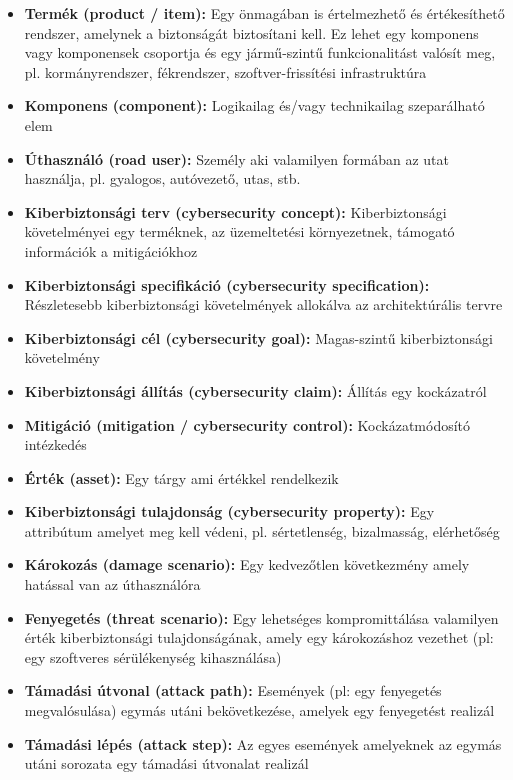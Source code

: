 \begin{itemize}
    \item \textbf{Termék (product / item):} Egy önmagában is értelmezhető és értékesíthető rendszer, amelynek a biztonságát biztosítani kell. Ez lehet egy komponens vagy komponensek csoportja és egy jármű-szintű funkcionalitást valósít meg, pl. kormányrendszer, fékrendszer, szoftver-frissítési infrastruktúra
    \item \textbf{Komponens (component):} Logikailag és/vagy technikailag szeparálható elem    
    \item \textbf{Úthasználó (road user):} Személy aki valamilyen formában az utat használja, pl. gyalogos, autóvezető, utas, stb.
    \item \textbf{Kiberbiztonsági terv (cybersecurity concept):} Kiberbiztonsági követelményei egy terméknek, az üzemeltetési környezetnek, támogató információk a mitigációkhoz
    \item \textbf{Kiberbiztonsági specifikáció (cybersecurity specification):} Részletesebb kiberbiztonsági követelmények allokálva az architektúrális tervre
    \item \textbf{Kiberbiztonsági cél (cybersecurity goal):} Magas-szintű kiberbiztonsági követelmény
    \item \textbf{Kiberbiztonsági állítás (cybersecurity claim):} Állítás egy kockázatról
    \item \textbf{Mitigáció (mitigation / cybersecurity control):} Kockázatmódosító intézkedés
    \item \textbf{Érték (asset):} Egy tárgy ami értékkel rendelkezik
    \item \textbf{Kiberbiztonsági tulajdonság (cybersecurity property):} Egy attribútum amelyet meg kell védeni, pl. sértetlenség, bizalmasság, elérhetőség
    \item \textbf{Károkozás (damage scenario):} Egy kedvezőtlen következmény amely hatással van az úthasználóra
    \item \textbf{Fenyegetés (threat scenario):} Egy lehetséges kompromittálása valamilyen érték kiberbiztonsági tulajdonságának, amely egy károkozáshoz vezethet (pl: egy szoftveres sérülékenység kihasználása)
    \item \textbf{Támadási útvonal (attack path):} Események (pl: egy fenyegetés megvalósulása) egymás utáni bekövetkezése, amelyek egy fenyegetést realizál
    \item \textbf{Támadási lépés (attack step):} Az egyes események amelyeknek az egymás utáni sorozata egy támadási útvonalat realizál
\end{itemize}

